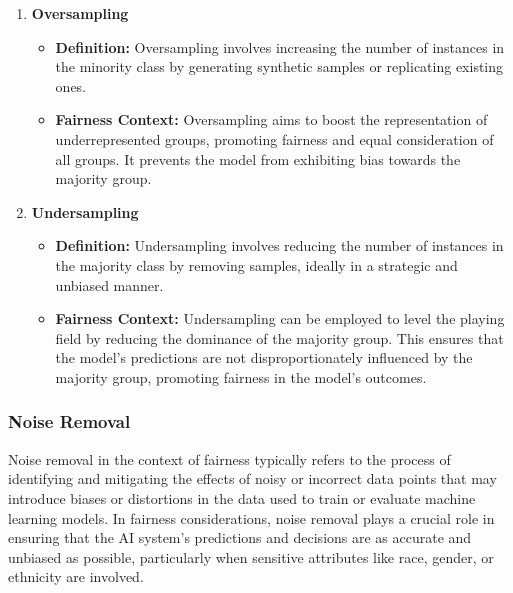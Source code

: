 \documentclass[12pt,a4paper,openright,twoside]{book}
\begin{document}
\begin{enumerate}

    \item \textbf{Oversampling}

    \begin{itemize}

        \item \textbf{Definition:} Oversampling involves increasing the number of instances in the minority class by generating synthetic samples or replicating existing ones.
        
        \item \textbf{Fairness Context:} Oversampling aims to boost the representation of underrepresented groups, promoting fairness and equal consideration of all groups. It prevents the model from exhibiting bias towards the majority group.
    
    \end{itemize}

    \item \textbf{Undersampling}

    \begin{itemize}

        \item \textbf{Definition:} Undersampling involves reducing the number of instances in the majority class by removing samples, ideally in a strategic and unbiased manner.
        
        \item \textbf{Fairness Context:} Undersampling can be employed to level the playing field by reducing the dominance of the majority group. This ensures that the model's predictions are not disproportionately influenced by the majority group, promoting fairness in the model's outcomes.
    
    \end{itemize}

\end{enumerate}

\subsubsection{Noise Removal}

Noise removal in the context of fairness typically refers to the process of identifying and mitigating the effects of noisy or incorrect data points that may introduce biases or distortions in the data used to train or evaluate machine learning models. In fairness considerations, noise removal plays a crucial role in ensuring that the AI system's predictions and decisions are as accurate and unbiased as possible, particularly when sensitive attributes like race, gender, or ethnicity are involved. \cite{NEURIPS2019_8d5e957f}
\end{document}
